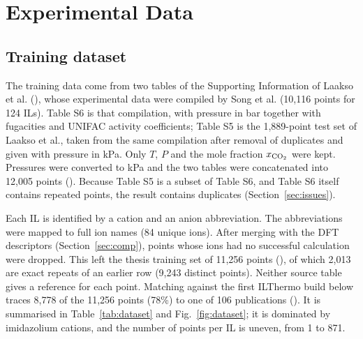 \section{Experimental Data}
\label{sec:data}

\subsection{Training dataset}
The training data come from two tables of the Supporting Information of Laakso et al.\cite{laakso2025machine} (), whose experimental data were compiled by Song et al.\cite{song2020prediction} (10,116 points for 124 ILs). Table S6 is that compilation, with pressure in bar together with fugacities and UNIFAC activity coefficients; Table S5 is the 1,889-point test set of Laakso et al., taken from the same compilation after removal of duplicates and given with pressure in kPa. Only $T$, $P$ and the \co{} mole fraction $x_{\mathrm{CO_2}}$ were kept. Pressures were converted to kPa and the two tables were concatenated into 12,005 points (). Because Table S5 is a subset of Table S6, and Table S6 itself contains repeated points, the result contains duplicates (Section~\ref{sec:issues}).

Each IL is identified by a cation and an anion abbreviation. The abbreviations were mapped to full ion names (84 unique ions). After merging with the DFT descriptors (Section~\ref{sec:comp}), points whose ions had no successful calculation were dropped. This left the thesis training set of 11,256 points (), of which 2,013 are exact repeats of an earlier row (9,243 distinct points). Neither source table gives a reference for each point. Matching against the first ILThermo build below traces 8,778 of the 11,256 points (78\%) to one of 106 publications (). It is summarised in Table~\ref{tab:dataset} and Fig.~\ref{fig:dataset}; it is dominated by imidazolium cations, and the number of points per IL is uneven, from 1 to 871.

